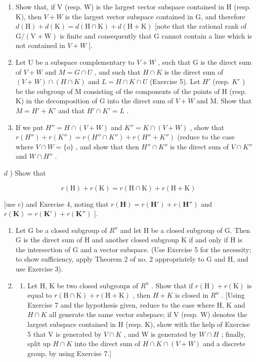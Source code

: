 \begin{enumerate}
\def\labelenumi{\alph{enumi})}
\item
  Show that, if V (resp. W) is the largest vector subspace contained in H (resp. K), then \(V + W\) is the largest vector subspace contained in G, and therefore \(d(\mathrm{H}) + d(\mathrm{K}) = d(\mathrm{H} \cap \mathrm{K}) + d(\mathrm{H} + \mathrm{K})\) {[}note that the rational rank of \(\mathrm{G}/(\mathrm{V} + \mathrm{W})\) is finite and consequently that G cannot contain a line which is not contained in \(V + W\) {]}.
\item
  Let U be a subspace complementary to \(V + W\) , such that G is the direct sum of \(V + W\) and \(M = G \cap U\) , and such that \(H \cap K\) is the direct sum of \((V + W) \cap (H \cap K)\) and \(L = H \cap K \cap U\) (Exercise 5). Let \(H'\) (resp. \(K'\) ) be the subgroup of M consisting of the components of the points of H (resp. K) in the decomposition of G into the direct sum of \(V + W\) and M. Show that \(M = H' + K'\) and that \(H' \cap K' = L\) .
\item
  If we put \(H'' = H \cap (V + W)\) and \(K'' = K \cap (V + W)\) , show that \(r(H'') + r(K'') = r(H'' \cap K'') + r(H'' + K'')\) (reduce to the case where \(V \cap W = \{o\}\) , and show that then \(H'' \cap K''\) is the direct sum of \(V \cap K''\) and \(W \cap H''\) .
\end{enumerate}

\(d\) ) Show that

\[
r (\mathrm{H}) + r (\mathrm{K}) = r (\mathrm{H} \cap \mathrm{K}) + r (\mathrm{H} + \mathrm{K})
\]

{[}use c) and Exercise 4, noting that \(r(\mathbf{H}) = r(\mathbf{H}') + r(\mathbf{H}'')\) and \(r(\mathbf{K}) = r(\mathbf{K}') + r(\mathbf{K}'' )\) {]}.

\begin{enumerate}
\def\labelenumi{\arabic{enumi})}
\setcounter{enumi}{6}
\item
  Let G be a closed subgroup of \(R^{n}\) and let H be a closed subgroup of G. Then G is the direct sum of H and another closed subgroup K if and only if H is the intersection of G and a vector subspace. (Use Exercise 5 for the necessity; to show sufficiency, apply Theorem 2 of no. 2 appropriately to G and H, and use Exercise 3).
\item
  \begin{enumerate}
  \def\labelenumii{\alph{enumii})}
  \tightlist
  \item
    Let H, K be two closed subgroups of \(R^{n}\) . Show that if \(r(\mathrm{H}) + r(\mathrm{K})\) is equal to \(r(\mathrm{H} \cap \mathrm{K}) + r(\mathrm{H} + \mathrm{K})\) , then \(H + K\) is closed in \(R^{n}\) . {[}Using Exercise 7 and the hypothesis given, reduce to the case where H, K and \(H \cap K\) all generate the same vector subspace; if V (resp. W) denotes the largest subspace contained in H (resp. K), show with the help of Exercise 5 that V is generated by \(V \cap K\) , and W is generated by \(W \cap H\) ; finally, split up \(H \cap K\) into the direct sum of \(H \cap K \cap (V + W)\) and a discrete group, by using Exercise 7.{]}
  \end{enumerate}
\end{enumerate}

